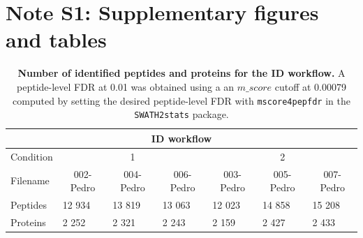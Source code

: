 \documentclass[11pt]{article}
\begin{document}
\maketitle

\section*{Note S1: Supplementary figures and tables}
\label{sec:fc-eval}

\begin{table}[h]
    \begin{tabular}{lllllll}
    \hline
    \multicolumn{7}{c}{ID workflow}                                                                                                                                                                                   \\ \hline
    Condition & \multicolumn{3}{c}{1}                                                                         & \multicolumn{3}{c}{2}                                                                         \\
    Filename       & \multicolumn{1}{c}{002-Pedro} & \multicolumn{1}{c}{004-Pedro} & \multicolumn{1}{c}{006-Pedro} & \multicolumn{1}{c}{003-Pedro} & \multicolumn{1}{c}{005-Pedro} & \multicolumn{1}{c}{007-Pedro} \\
    Peptides  & 12 934                        & 13 819                        & 13 063                        & 12 023                        & 14 858                        & 15 208                        \\
    Proteins  & 2 252                         & 2 321                         & 2 243                         & 2 159                         & 2 427                         & 2 433                         \\ \hline
    \end{tabular}
     \caption{{\bf Number of identified peptides and proteins for the ID workflow.} A peptide-level FDR at 0.01 was obtained using a an $m\_score$ cutoff at 0.00079 computed by setting the desired peptide-level FDR with \texttt{mscore4pepfdr} in the \texttt{SWATH2stats} package.
          \label{fig:osw_peptide_and_protein_id}}
\end{table}
        
\end{document}

